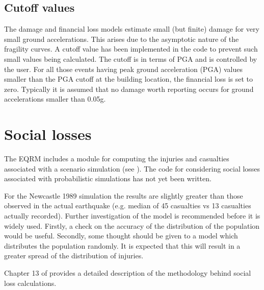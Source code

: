 \subsection{Cutoff values}

The damage and financial loss models estimate small (but finite)
damage for very small ground accelerations. This arises due to the
asymptotic nature of the fragility curves. A cutoff value has been
implemented in the code to prevent such small values being
calculated. The cutoff is in terms of PGA and is controlled by
the user. For all those events having peak ground acceleration (PGA) values
smaller than the PGA cutoff at the building
location, the financial loss is set to zero. Typically it is
assumed that no damage worth reporting occurs for ground
accelerations smaller than 0.05g.


\section{Social losses}

The EQRM includes a module for computing the injuries and
casualties associated with a scenario simulation (see
). The code for considering social
losses associated with probabilistic simulations has not yet been
written. 

For the Newcastle 1989 simulation the results are slightly greater
than those observed in the actual earthquake (e.g. median of 45
casualties vs 13 casualties actually recorded). Further
investigation of the model is recommended before it is widely
used. Firstly, a check on the accuracy of the distribution of the
population would be useful. Secondly, some thought should be given
to a model which distributes the population randomly. It is
expected that this will result in a greater spread of the
distribution of injuries.

Chapter 13 of \cite{dr_FEMA99b} provides a detailed description of
the methodology behind social loss calculations.


